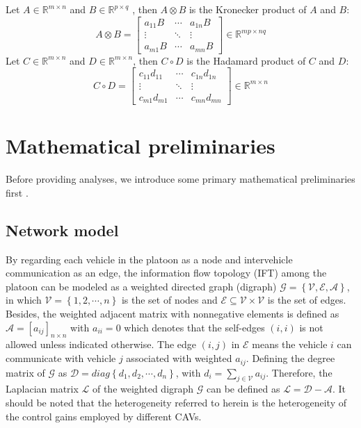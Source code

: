 \documentclass[a4paper]{cas-sc}
\begin{document}
Let $A \in {\mathbb{R}^{m \times n}}$ and $B \in {\mathbb{R}^{p \times q}}$ , then  $A \otimes B$ is the Kronecker product of $A$ and $B$:
\begin{equation*}
  A \otimes B = \left[ {\begin{array}{*{20}{c}}
          {{a_{11}}B} & \cdots & {{a_{1n}}B} \\
          \vdots      & \ddots & \vdots      \\
          {{a_{m1}}B} & \cdots & {{a_{mn}}B}
        \end{array}} \right] \in {\mathbb{R}^{mp \times nq}}
\end{equation*}
Let $C \in {\mathbb{R}^{m \times n}} $ and $D \in {\mathbb{R}^{m \times n}} $, then $C \circ D$ is the Hadamard product of $C$ and $D$:
\begin{equation*}
  C \circ D = \left[ {\begin{array}{*{20}{c}}
          {{c_{11}}{d_{11}}} & \cdots & {{c_{1n}}{d_{1n}}} \\
          \vdots             & \ddots & \vdots             \\
          {{c_{m1}}{d_{m1}}} & \cdots & {{c_{mn}}{d_{mn}}}
        \end{array}} \right] \in {\mathbb{R}^{m \times n}}
\end{equation*}


\section{Mathematical preliminaries}
\label{Section 2}
Before providing analyses, we introduce some primary mathematical preliminaries first .

\subsection{Network model}
\label{Section 2.1}

By regarding each vehicle in the platoon as a node and intervehicle communication as an edge, the information flow topology (IFT) among the platoon can be modeled as a weighted directed graph (digraph) $ \mathcal{G} = \left\{ {\mathcal{V},\mathcal{E},\mathcal{A}} \right\}$, in which $\mathcal{V} = \left\{ {1,2, \cdots ,n} \right\}$ is the set of nodes and $\mathcal{E} \subseteq \mathcal{V} \times \mathcal{V} $ is the set of edges. Besides, the weighted adjacent matrix with nonnegative elements is defined as $\mathcal{A} = {[{a_{ij}}]_{n \times n}}$ with ${a_{ii}} = 0$ which denotes that the self-edges $\left( {i,i} \right)$ is not allowed unless indicated otherwise. The edge $\left( {i,j} \right)$ in $\mathcal{E}$ means the vehicle $i$ can communicate with vehicle $j$ associated with weighted ${a_{ij}}$. Defining the degree matrix of $\mathcal{G}$ as $\mathcal{D} = diag\left\{ {{d_1},{d_2}, \cdots ,{d_n}} \right\}$, with ${d_i} = \sum\limits_{j \in \mathcal{V}} {{a_{ij}}} $. Therefore, the Laplacian matrix $\mathcal{L}$ of the weighted digraph $\mathcal{G}$ can be defined as $\mathcal{L} = \mathcal{D} - \mathcal{A}$. It should be noted that the heterogeneity referred to herein is the heterogeneity of the control gains employed by different CAVs.
\end{document}
